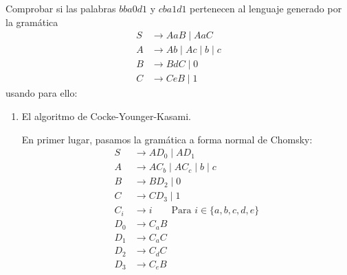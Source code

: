 \begin{ejercicio}\label{ej:1.6.7}
    Comprobar si las palabras $bba0d1$ y $cba1d1$ pertenecen al lenguaje generado por la gramática
    \begin{align*}
        S &\rightarrow AaB \mid AaC \\
        A &\rightarrow Ab \mid Ac \mid b \mid c \\
        B &\rightarrow BdC \mid 0 \\
        C &\rightarrow CeB \mid 1
    \end{align*}
    usando para ello:
    \begin{enumerate}
        \item El algoritmo de Cocke-Younger-Kasami.
        
        En primer lugar, pasamos la gramática a forma normal de Chomsky:
        \begin{align*}
            S &\rightarrow AD_0 \mid AD_1 \\
            A &\rightarrow AC_b \mid AC_c \mid b \mid c \\
            B &\rightarrow BD_2 \mid 0 \\
            C &\rightarrow CD_3 \mid 1 \\
            C_i &\rightarrow i\qquad \text{Para } i\in \{a,b,c,d,e\} \\
            D_0 &\rightarrow C_aB \\
            D_1 &\rightarrow C_aC \\
            D_2 &\rightarrow C_dC \\
            D_3 &\rightarrow C_eB
        \end{align*}


\end{enumerate}
\end{ejercicio}
